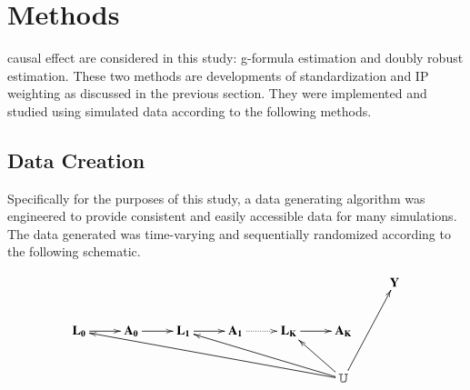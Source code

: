 
\chapter{Methods} \label{Methods}


 causal effect are considered in this study: g-formula estimation and doubly robust estimation.  These two methods are developments of standardization and IP weighting as discussed in the previous section.  They were implemented and studied using simulated data according to the following methods.  

\section{Data Creation} \label{data}
Specifically for the purposes of this study, a data generating algorithm was engineered to provide consistent and easily accessible data for many simulations.  The data generated was time-varying and sequentially randomized according to the following schematic.  

\begin{figure}[h!]
  \begin{displaymath}
    \xymatrix{
    	& & & & & & \mathbf{Y} \\
        \mathbf{L_0} \ar[r] & \mathbf{A_0} \ar[r]  & \mathbf{ L_1} \ar[r]  & \mathbf{A_1} \ar@{.>}[r] & \mathbf{L_K} \ar[r] & \mathbf{A_K} &  \\ 
        & & & & & \ar[lllllu] \ar[lllu]  \ar[lu] \mathbb{U}  \ar[ruu]  & 
        }
\end{displaymath}
 \end{figure}



